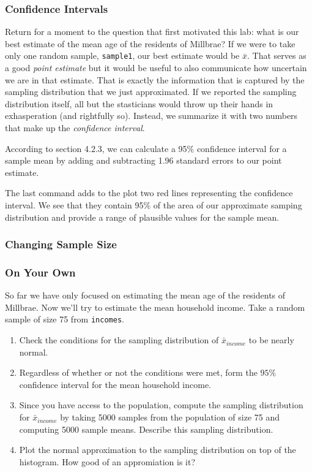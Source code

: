 \documentclass[11pt]{article}
\begin{document}
\subsubsection*{Confidence Intervals}
Return for a moment to the question that first motivated this lab: what is our best estimate of the mean age of the residents of Millbrae?  If we were to take only one random sample, \texttt{sample1}, our best estimate would be $\bar{x}$.  That serves as a good \emph{point estimate} but it would be useful to also communicate how uncertain we are in that estimate.  That is exactly the information that is captured by the sampling distribution that we just approximated.  If we reported the sampling distribution itself, all but the stasticians would throw up their hands in exhasperation (and rightfully so).  Instead, we summarize it with two numbers that make up the \emph{confidence interval}.

According to section 4.2.3, we can calculate a 95\% confidence interval for a sample mean by adding and subtracting 1.96 standard errors to our point estimate.


The last command adds to the plot two red lines representing the confidence interval.  We see that they contain 95\% of the area of our approximate samping distribution and provide a range of plausible values for the sample mean.

\subsubsection*{Changing Sample Size}

\subsubsection*{On Your Own}
So far we have only focused on estimating the mean age of the residents of Millbrae.  Now we'll try to estimate the mean household income.  Take a random sample of size 75 from \texttt{incomes}.
\begin{enumerate}
\item Check the conditions for the sampling distribution of $\bar{x}_{income}$ to be nearly normal.
\item Regardless of whether or not the conditions were met, form the $95\%$ confidence interval for the mean household income.
\item Since you have access to the population, compute the sampling distribution for $\bar{x}_{income}$ by taking 5000 samples from the population of size 75 and  computing 5000 sample means.  Describe this sampling distribution.
\item Plot the normal approximation to the sampling distribution on top of the histogram.  How good of an appromiation is it?

\end{enumerate}
\end{document}
